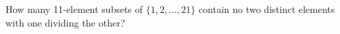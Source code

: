 How many 11-element subsets of $\{1,2,\ldots,21\}$ contain no two distinct elements with one dividing the other?
